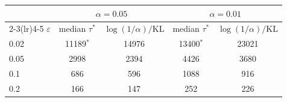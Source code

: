 \begin{tabular}{lcccc}
\toprule
& \multicolumn{2}{c}{$\alpha=0.05$} & \multicolumn{2}{c}{$\alpha=0.01$}\\
\cmidrule(lr){2-3}\cmidrule(lr){4-5}
$\varepsilon$ & median $\tau^*$ & $\log(1/\alpha)/\mathrm{KL}$ & median $\tau^*$ & $\log(1/\alpha)/\mathrm{KL}$\\
\midrule
0.02 & 11189$^*$ & 14976 & 13400$^*$ & 23021\\
0.05 & 2998 & 2394 & 4426 & 3680\\
0.1 & 686 & 596 & 1088 & 916\\
0.2 & 166 & 147 & 252 & 226\\
\bottomrule
\end{tabular}
